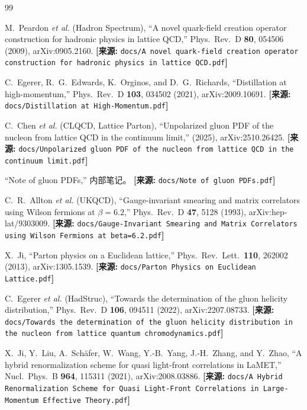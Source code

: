 \documentclass[12pt,a4paper]{ctexart}
\theoremstyle{definition}
\begin{document}
\begin{thebibliography}{99}

M.~Peardon \textit{et al.} (Hadron Spectrum),
``A novel quark-field creation operator construction for hadronic physics in lattice QCD,''
Phys.\ Rev.\ D \textbf{80}, 054506 (2009), arXiv:0905.2160.
\quad\textbf{[来源:} \texttt{docs/A novel quark-field creation operator construction for hadronic physics in lattice QCD.pdf}\textbf{]}

C.~Egerer, R.~G.~Edwards, K.~Orginos, and D.~G.~Richards,
``Distillation at high-momentum,''
Phys.\ Rev.\ D \textbf{103}, 034502 (2021), arXiv:2009.10691.
\quad\textbf{[来源:} \texttt{docs/Distillation at High-Momentum.pdf}\textbf{]}

C.~Chen \textit{et al.} (CLQCD, Lattice Parton),
``Unpolarized gluon PDF of the nucleon from lattice QCD in the continuum limit,''
(2025), arXiv:2510.26425.
\quad\textbf{[来源:} \texttt{docs/Unpolarized gluon PDF of the nucleon from lattice QCD in the continuum limit.pdf}\textbf{]}

``Note of gluon PDFs,'' 内部笔记。
\quad\textbf{[来源:} \texttt{docs/Note of gluon PDFs.pdf}\textbf{]}

C.~R.~Allton \textit{et al.} (UKQCD),
``Gauge-invariant smearing and matrix correlators using Wilson fermions at $\beta=6.2$,''
Phys.\ Rev.\ D \textbf{47}, 5128 (1993), arXiv:hep-lat/9303009.
\quad\textbf{[来源:} \texttt{docs/Gauge-Invariant Smearing and Matrix Correlators using Wilson Fermions at beta=6.2.pdf}\textbf{]}

X.~Ji,
``Parton physics on a Euclidean lattice,''
Phys.\ Rev.\ Lett.\ \textbf{110}, 262002 (2013), arXiv:1305.1539.
\quad\textbf{[来源:} \texttt{docs/Parton Physics on Euclidean Lattice.pdf}\textbf{]}

C.~Egerer \textit{et al.} (HadStruc),
``Towards the determination of the gluon helicity distribution,''
Phys.\ Rev.\ D \textbf{106}, 094511 (2022), arXiv:2207.08733.
\quad\textbf{[来源:} \texttt{docs/Towards the determination of the gluon helicity distribution in the nucleon from lattice quantum chromodynamics.pdf}\textbf{]}

X.~Ji, Y.~Liu, A.~Sch\"afer, W.~Wang, Y.-B.~Yang, J.-H.~Zhang, and Y.~Zhao,
``A hybrid renormalization scheme for quasi light-front correlations in LaMET,''
Nucl.\ Phys.\ B \textbf{964}, 115311 (2021), arXiv:2008.03886.
\quad\textbf{[来源:} \texttt{docs/A Hybrid Renormalization Scheme for Quasi Light-Front Correlations in Large-Momentum Effective Theory.pdf}\textbf{]}


\end{thebibliography}
\end{document}
